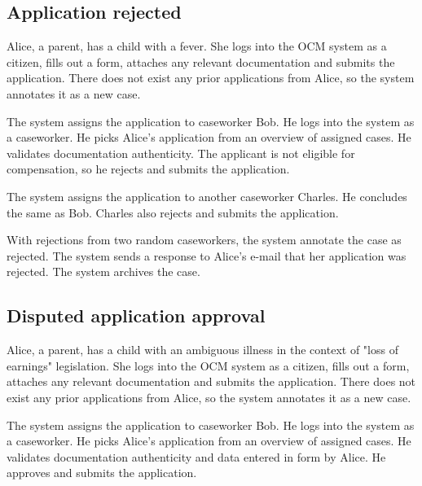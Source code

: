 \documentclass{article}
\begin{document}
\subsection*{Application rejected}

Alice, a parent, has a child with a fever. She logs into the OCM system as a citizen, fills out a form, attaches any relevant documentation and submits the application. There does not exist any prior applications from Alice, so the system annotates it as a new case.

\vspace{2mm}

The system assigns the application to caseworker Bob. He logs into the system as a caseworker. He picks Alice's application from an overview of assigned cases. He validates documentation authenticity. The applicant is not eligible for compensation, so he rejects and submits the application.

\vspace{2mm}

The system assigns the application to another caseworker Charles. He concludes the same as Bob. Charles also rejects and submits the application.

\vspace{2mm}

With rejections from two random caseworkers, the system annotate the case as rejected. The system sends a response to Alice's e-mail that her application was rejected. The system archives the case.

\subsection*{Disputed application approval}

Alice, a parent, has a child with an ambiguous illness in the context of "loss of earnings" legislation. She logs into the OCM system as a citizen, fills out a form, attaches any relevant documentation and submits the application. There does not exist any prior applications from Alice, so the system annotates it as a new case.

\vspace{2mm}

The system assigns the application to caseworker Bob. He logs into the system as a caseworker. He picks Alice's application from an overview of assigned cases. He validates documentation authenticity and data entered in form by Alice. He approves and submits the application.
\end{document}
